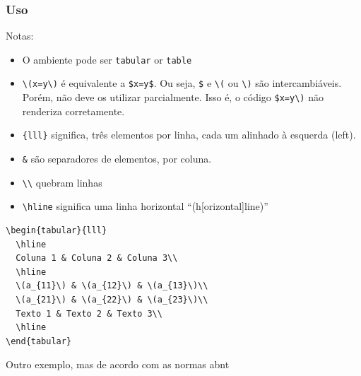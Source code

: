 \documentclass[11pt]{article}
\begin{document}
\subsubsection{Uso}
\label{sec:orgebb6e31}
Notas:
\begin{itemize}
\item O ambiente pode ser \texttt{tabular} or \texttt{table}
\item \texttt{\textbackslash{}(x=y\textbackslash{})} é equivalente a \texttt{\$x=y\$}. Ou seja, \texttt{\$} e \texttt{\textbackslash{}(} ou \texttt{\textbackslash{})} são intercambiáveis. Porém, não deve os utilizar parcialmente. Isso é, o código \texttt{\$x=y\textbackslash{})} não renderiza corretamente.
\item \texttt{\{lll\}} significa, três elementos por linha, cada um alinhado à esquerda (left).
\item \texttt{\&} são separadores de elementos, por coluna.
\item \texttt{\textbackslash{}\textbackslash{}} quebram linhas
\item \texttt{\textbackslash{}hline} significa uma linha horizontal ``(h[orizontal]line)''
\end{itemize}

\begin{verbatim}
\begin{tabular}{lll}
  \hline
  Coluna 1 & Coluna 2 & Coluna 3\\
  \hline
  \(a_{11}\) & \(a_{12}\) & \(a_{13}\)\\
  \(a_{21}\) & \(a_{22}\) & \(a_{23}\)\\
  Texto 1 & Texto 2 & Texto 3\\
  \hline
\end{tabular}
\end{verbatim}

Outro exemplo, mas de acordo com as normas abnt
\end{document}
